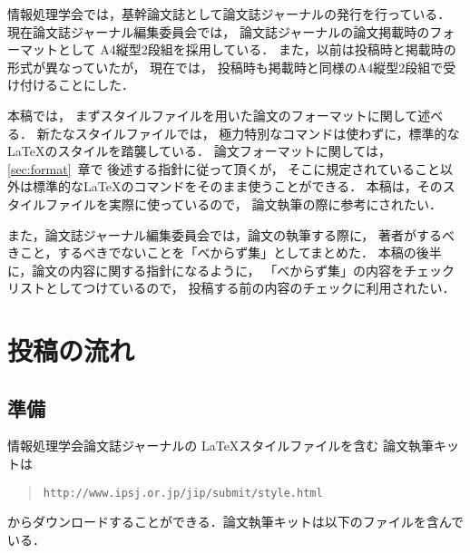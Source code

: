 \documentclass[submit]{ipsj}
\def\|{\verb|}
\begin{document}
情報処理学会では，基幹論文誌として論文誌ジャーナルの発行を行っている．
現在論文誌ジャーナル編集委員会では，
論文誌ジャーナルの論文掲載時のフォーマットとして
A4縦型2段組を採用している．
また，以前は投稿時と掲載時の形式が異なっていたが，
現在では，
投稿時も掲載時と同様のA4縦型2段組で受け付けることにした．



本稿では，
まずスタイルファイルを用いた論文のフォーマットに関して述べる．
新たなスタイルファイルでは，
極力特別なコマンドは使わずに，標準的な \LaTeX のスタイルを踏襲している．
論文フォーマットに関しては，\ref{sec:format}~章で
後述する指針に従って頂くが，
そこに規定されていること以外は標準的な\LaTeX のコマンドをそのまま使うことができる．
本稿は，そのスタイルファイルを実際に使っているので，
論文執筆の際に参考にされたい．





また，論文誌ジャーナル編集委員会では，論文の執筆する際に，
著者がするべきこと，するべきでないことを「べからず集」としてまとめた．
本稿の後半に，論文の内容に関する指針になるように，
「べからず集」の内容をチェックリストとしてつけているので，
投稿する前の内容のチェックに利用されたい．




%2
\section{投稿の流れ}


%2.1
\subsection{準備}


情報処理学会論文誌ジャーナルの \LaTeX スタイルファイルを含む
論文執筆キットは
\begin{quote}
\small
\|http://www.ipsj.or.jp/jip/submit/style.html|
\end{quote}
からダウンロードすることができる．論文執筆キットは以下のファイルを含んでいる．
\end{document}
